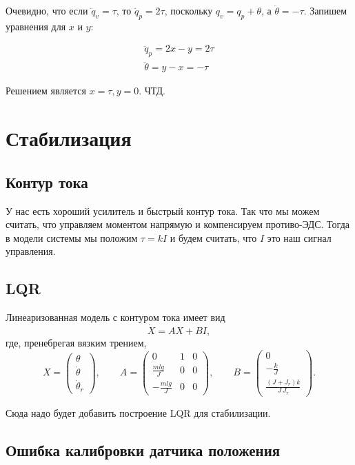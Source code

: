 \documentclass{article}
\begin{document}
Очевидно, что если $\ddot q_v = \tau$, то $\ddot q_p = 2\tau$, поскольку $q_v = q_p + \theta$, а $\ddot\theta = -\tau$. Запишем уравнения для $x$ и $y$:

\begin{align*}
\ddot q_p = 2x - y = 2\tau\\
\ddot\theta = y - x = -\tau
\end{align*}

Решением является $x=\tau, y=0$. ЧТД.

\fi

\section{Стабилизация}

\subsection{Контур тока}
У нас есть хороший усилитель и быстрый контур тока. Так что мы можем считать, что управляем моментом напрямую и компенсируем противо-ЭДС. Тогда в модели системы мы положим $\tau=kI$ и будем считать, что $I$ это наш сигнал управления.  
\subsection{LQR}
Линеаризованная модель с контуром тока имеет вид
\[
	\dot{X} = A X + B I,
\]
где, пренебрегая вязким трением,
\[
X = \begin{pmatrix}\theta \\ \dot\theta \\ \dot\theta_r \end{pmatrix},
\qquad 
A= \begin{pmatrix} 0 & 1 & 0 \\ \frac{mlg}{J} & 0 & 0 \\ -\frac{mlg}{J} & 0 & 0 \end{pmatrix},
\qquad 
B=\begin{pmatrix}0\\ -\frac{k}{J} \\ \frac{(J+J_r)k}{J\,J_r} \end{pmatrix}.
\]

Сюда надо будет добавить построение LQR для стабилизации.

\subsection{Ошибка калибровки датчика положения}
\end{document}
